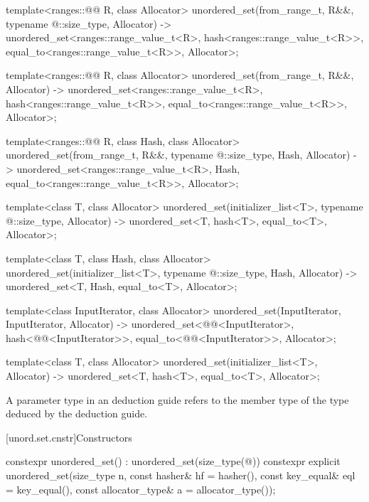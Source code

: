 \begin{codeblock}
{  template<ranges::@@ R, class Allocator>
    unordered_set(from_range_t, R&&, typename @\seebelow@::size_type, Allocator)
      -> unordered_set<ranges::range_value_t<R>, hash<ranges::range_value_t<R>>,
                       equal_to<ranges::range_value_t<R>>, Allocator>;

  template<ranges::@@ R, class Allocator>
    unordered_set(from_range_t, R&&, Allocator)
      -> unordered_set<ranges::range_value_t<R>, hash<ranges::range_value_t<R>>,
                       equal_to<ranges::range_value_t<R>>, Allocator>;

  template<ranges::@@ R, class Hash, class Allocator>
    unordered_set(from_range_t, R&&, typename @\seebelow@::size_type, Hash, Allocator)
      -> unordered_set<ranges::range_value_t<R>, Hash,
                       equal_to<ranges::range_value_t<R>>, Allocator>;

  template<class T, class Allocator>
    unordered_set(initializer_list<T>, typename @\seebelow@::size_type, Allocator)
      -> unordered_set<T, hash<T>, equal_to<T>, Allocator>;

  template<class T, class Hash, class Allocator>
    unordered_set(initializer_list<T>, typename @\seebelow@::size_type, Hash, Allocator)
      -> unordered_set<T, Hash, equal_to<T>, Allocator>;

  template<class InputIterator, class Allocator>
    unordered_set(InputIterator, InputIterator, Allocator)
      -> unordered_set<@@<InputIterator>,
                       hash<@@<InputIterator>>,
                       equal_to<@@<InputIterator>>,
                       Allocator>;

  template<class T, class Allocator>
    unordered_set(initializer_list<T>, Allocator)
      -> unordered_set<T, hash<T>, equal_to<T>, Allocator>;
}
\end{codeblock}

\pnum
A  parameter type in an  deduction guide
refers to the  member type of
the type deduced by the deduction guide.

[unord.set.cnstr]{Constructors}

%
\begin{itemdecl}
constexpr unordered_set() : unordered_set(size_type(@\seebelow@)) { }
constexpr explicit unordered_set(size_type n, const hasher& hf = hasher(),
                                 const key_equal& eql = key_equal(),
                                 const allocator_type& a = allocator_type());
\end{itemdecl}

